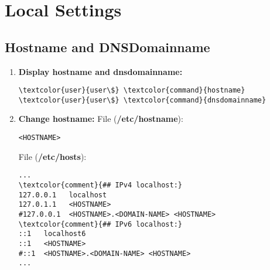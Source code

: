 \documentclass[10pt, a4paper, onecolumn, openany]{book} %
\begin{document}
\chapter{Local Settings}
\section{Hostname and DNSDomainname}
\begin{enumerate}
    \item \textbf{Display hostname and dnsdomainname:}
\begin{Verbatim}[commandchars=\\\{\}]
\textcolor{user}{user\$} \textcolor{command}{hostname}
\textcolor{user}{user\$} \textcolor{command}{dnsdomainname}
\end{Verbatim}
    \item \textbf{Change hostname:}
\newline File (\textbf{\textcolor{file}{/etc/hostname}}):
\begin{Verbatim}[commandchars=\\\{\}]
<HOSTNAME>
\end{Verbatim}
File (\textbf{\textcolor{file}{/etc/hosts}}):
\begin{Verbatim}[commandchars=\\\{\}]
...
\textcolor{comment}{## IPv4 localhost:}
127.0.0.1   localhost
127.0.1.1   <HOSTNAME>
#127.0.0.1  <HOSTNAME>.<DOMAIN-NAME> <HOSTNAME>
\textcolor{comment}{## IPv6 localhost:}
::1   localhost6
::1   <HOSTNAME>
#::1  <HOSTNAME>.<DOMAIN-NAME> <HOSTNAME>
...
\end{Verbatim}
\end{enumerate}
\end{document}
